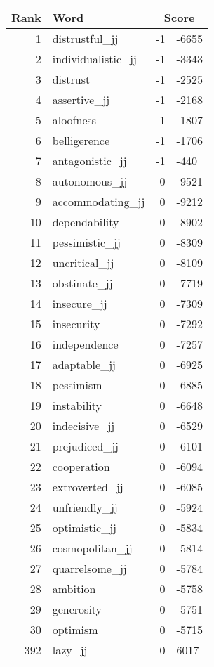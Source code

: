 \begin{longtable}[!htbp]{| rlr@{.}l |}
    \hline
    \textbf{Rank} & \textbf{Word} & \multicolumn{2}{c|}{\textbf{Score}} \\
    \hline
    \endhead
    1 & distrustful\_jj & -1 & -6655 \\
    2 & individualistic\_jj & -1 & -3343 \\
    3 & distrust & -1 & -2525 \\
    4 & assertive\_jj & -1 & -2168 \\
    5 & aloofness & -1 & -1807 \\
    6 & belligerence & -1 & -1706 \\
    7 & antagonistic\_jj & -1 & -440 \\
    8 & autonomous\_jj & 0 & -9521 \\
    9 & accommodating\_jj & 0 & -9212 \\
    10 & dependability & 0 & -8902 \\
    11 & pessimistic\_jj & 0 & -8309 \\
    12 & uncritical\_jj & 0 & -8109 \\
    13 & obstinate\_jj & 0 & -7719 \\
    14 & insecure\_jj & 0 & -7309 \\
    15 & insecurity & 0 & -7292 \\
    16 & independence & 0 & -7257 \\
    17 & adaptable\_jj & 0 & -6925 \\
    18 & pessimism & 0 & -6885 \\
    19 & instability & 0 & -6648 \\
    20 & indecisive\_jj & 0 & -6529 \\
    21 & prejudiced\_jj & 0 & -6101 \\
    22 & cooperation & 0 & -6094 \\
    23 & extroverted\_jj & 0 & -6085 \\
    24 & unfriendly\_jj & 0 & -5924 \\
    25 & optimistic\_jj & 0 & -5834 \\
    26 & cosmopolitan\_jj & 0 & -5814 \\
    27 & quarrelsome\_jj & 0 & -5784 \\
    28 & ambition & 0 & -5758 \\
    29 & generosity & 0 & -5751 \\
    30 & optimism & 0 & -5715 \\
    392 & lazy\_jj & 0 & 6017 \\

\end{longtable}
